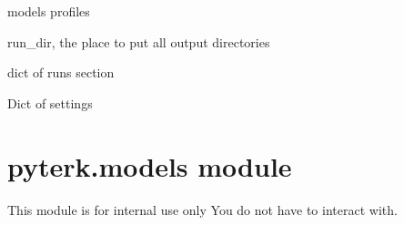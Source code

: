\documentclass[letterpaper,10pt,english]{sphinxmanual}
\begin{document}
\begin{fulllineitems}
\label{\detokenize{PyTerK:pyterk.config.models}}
\sphinxAtStartPar
models profiles

\end{fulllineitems}


\begin{fulllineitems}
\label{\detokenize{PyTerK:pyterk.config.run_dir}}
\sphinxAtStartPar
run\_dir, the place to put all output directories

\end{fulllineitems}


\begin{fulllineitems}
\label{\detokenize{PyTerK:pyterk.config.runs}}
\sphinxAtStartPar
dict of runs section

\end{fulllineitems}


\begin{fulllineitems}
\label{\detokenize{PyTerK:pyterk.config.settings}}
\sphinxAtStartPar
Dict of settings

\end{fulllineitems}



\section{pyterk.models module}
\label{\detokenize{PyTerK:module-pyterk.models}}\label{\detokenize{PyTerK:pyterk-models-module}}
\sphinxAtStartPar
This module is for internal use only \sphinxhyphen{} You do not have to interact with.
\end{document}
